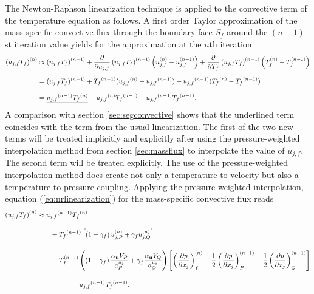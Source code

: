 The Newton-Raphson linearization technique is applied to the convective term of the temperature equation as follows. A first order Taylor approximation of the mass-specific convective flux through the boundary face \(S_f\) around the \((n-1)\)st iteration value yields for the approximation at the \(n\)th iteration
\begin{align}
  \label{eq:nrlinearization}
  \left(u_{j,f} T_f \right)^{(n)} 
  &\approx 
  \left(u_{j,f} T_f \right)^{(n-1)} 
  + \frac{\partial}{\partial u_{j,f}}\left( u_{j,f} T_f \right)^{(n-1)} \left(u_{j,f}^{(n)} - u_{j,f}^{(n-1)} \right) 
  + \frac{\partial}{\partial T_f}\left( u_{j,f} T_f \right)^{(n-1)} \left( T_f^{(n)} - T_f^{(n-1)} \right) \nonumber\\[0.5em]
  &=
  (u_{j,f} T_f )^{(n-1)} 
  + \vphantom{(u_{j,f} T_f)}{T_f}^{(n-1)} (\vphantom{(u_{j,f} T_f)}{u_{j,f}}^{(n)} - \vphantom{(u_{j,f} T_f)}{u_{j,f}}^{(n-1)} ) 
  +  \vphantom{(u_j T)}{u_{j,f}}^{(n-1)} ( \vphantom{(u_j T)}{T_f}^{(n)} - \vphantom{(u_j T)}{T_f}^{(n-1)} ) \nonumber\\[0.7em]
  &=
  \underline{\vphantom{(u_j T)}{u_{j,f}}^{(n-1)} \vphantom{(u_{j,f})}{T_f}^{(n)}}  + \vphantom{(u_{j,f} T_f)}{u_{j,f}}^{(n)} \vphantom{(u_jT)}{T_f}^{(n-1)}  -  \vphantom{(u_j T)}{u_{j,f}}^{(n-1)} \vphantom{(u_j T)}{T_f}^{(n-1)}.
\end{align}
A comparison with section \ref{sec:segconvective} shows that the underlined term coincides with the term from the usual linearization. The first of the two new terms will be treated implicitly and explicitly after using the pressure-weighted interpolation method from section \ref{sec:massflux} to interpolate the value of \(u_{j,f}\). The second term will be treated explicitly. The use of the pressure-weighted interpolation method does create not only a temperature-to-velocity but also a temperature-to-pressure coupling. Applying the pressure-weighted interpolation, equation (\ref{eq:nrlinearization}) for the mass-specific convective flux reads
\begin{align*}
  \left(u_{j,f} T_f \right)^{(n)} 
  &\approx 
    \vphantom{(u_j T)}{u_{j,f}}^{(n-1)} \vphantom{(u_{j,f})}{T_f}^{(n)} \\[1em]
    &\quad\quad
    + \vphantom{(u_jT)}{T_f}^{(n-1)}  \left[\left(1 - \gamma_f\right) u_{j,P}^{(n)} + \gamma_f u_{j,Q}^{(n)} \right] \nonumber\\[1em]
    &\quad\quad 
    - T_f^{(n-1)}\left(\left(1 - \gamma_f\right) \frac{\alpha_\vec{u} V_P}{a_P^{u_j}} + \gamma_f \frac{\alpha_\vec{u} V_Q}{a_Q^{u_j}}\right)
    \left[ 
    \left(\frac{\partial p}{\partial x_j}\right)_f^{(n)} 
    -  \frac{1}{2} \left( \frac{\partial p}{\partial x_j} \right)_P^{(n-1)} 
    - \frac{1}{2} \left(\frac{\partial p}{\partial x_j}\right)_Q^{(n-1)} 
    \right] \nonumber \\[1em]
    &  \quad\quad\quad\quad\quad -\vphantom{(u_j T)}{u_{j,f}}^{(n-1)} \vphantom{(u_j T)}{T_f}^{(n-1)}.
\end{align*}
